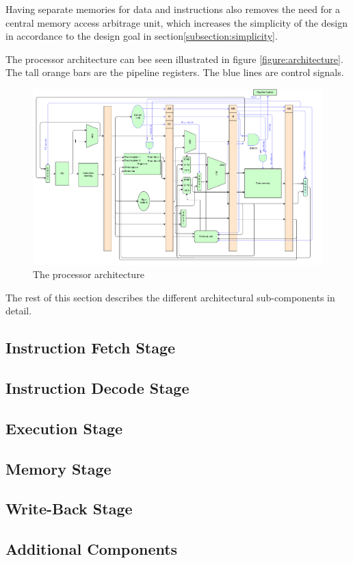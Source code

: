 Having separate memories for data and instructions also removes the need for a central memory access arbitrage unit, which increases the simplicity of the design in accordance to the design goal in section\vref{subsection:simplicity}.

The processor architecture can bee seen illustrated in figure \vref{figure:architecture}.
The tall orange bars are the pipeline registers.
The blue lines are control signals.

\begin{figure}[H]
    \includegraphics[width=\textwidth]{illustrations/processor.pdf}
    \caption{The processor architecture}
    \label{figure:architecture}
\end{figure}


The rest of this section describes the different architectural sub-components in detail.

\subsection{Instruction Fetch Stage}
    

\subsection{Instruction Decode Stage}
    

\subsection{Execution Stage}
    

\subsection{Memory Stage}
    

\subsection{Write-Back Stage}
    

\subsection{Additional Components}
    
